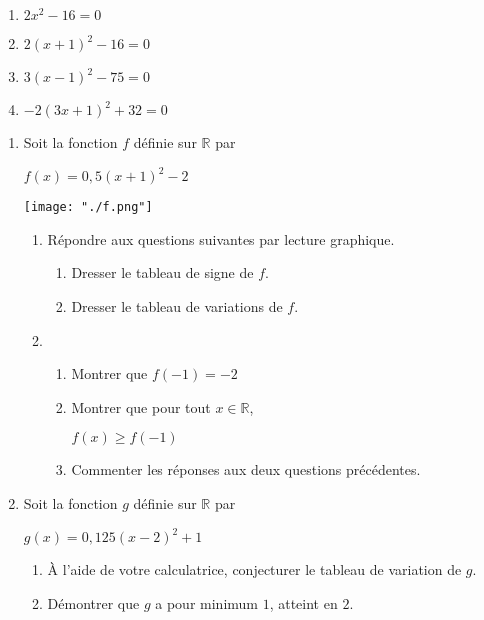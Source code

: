 \documentclass{exercice}
\begin{document}
\begin{multicols*}{2}
\begin{exo}
  \begin{enumerate}
    \item $2x^2 - 16 = 0$
    \item $2(x + 1)^2 - 16 = 0$
    \item $3(x - 1)^2 - 75 = 0$
    \item $-2(3x + 1)^2 + 32 = 0$
  \end{enumerate}
\end{exo}

\begin{exo}
\begin{enumerate}
\item Soit la fonction $f$ définie sur $\mathbb{R}$ par

  \centerline{$f(x) = 0,5(x + 1)^2 - 2$}

  \centerline{\texttt{[image: "./f.png"]}}




  \begin{enumerate}
  \item Répondre aux questions suivantes par lecture graphique.
    \begin{enumerate}[label=\textbf{\roman*.}]
    \item Dresser le tableau de signe de $f$.
    \item Dresser le tableau de variations de $f$.
    \end{enumerate}

  \item \begin{enumerate}[label=\textbf{\roman*.}]
    \item Montrer que $f(-1) = -2$
    \item Montrer que pour tout $x\in \mathbb{R}$,

      \centerline{$f(x) \geq f(-1)$}
    \item Commenter les réponses aux deux questions précédentes. 
    \end{enumerate}
  \end{enumerate}

\item Soit la fonction $g$ définie sur $\mathbb{R}$ par

  \centerline{$g(x) = 0,125(x - 2)^{2} + 1$}
  \begin{enumerate}
  \item À l'aide de votre calculatrice, conjecturer le tableau de variation de $g$.
  \item Démontrer que $g$ a pour minimum $1$, atteint en $2$.
  \end{enumerate}


\end{enumerate}
\end{exo}
\end{multicols*}
\end{document}
